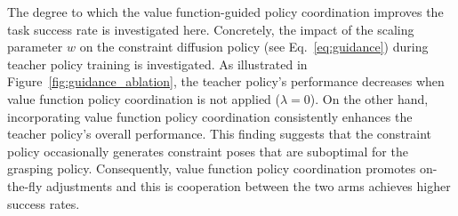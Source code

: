 The degree to which the value function-guided policy coordination improves the task success rate is investigated here. 
Concretely, the impact of the scaling parameter $w$ on the constraint diffusion policy (see Eq.~\ref{eq:guidance}) during teacher policy training is investigated.
As illustrated in Figure~\ref{fig:guidance_ablation}, the teacher policy's performance decreases when value function policy coordination is not applied (\ie $\lambda=0$).
On the other hand, incorporating value function policy coordination consistently enhances the teacher policy's overall performance.
This finding suggests that the constraint policy occasionally generates constraint poses that are suboptimal for the grasping policy. 
Consequently, value function policy coordination promotes on-the-fly adjustments and this is cooperation between the two arms achieves higher success rates.

